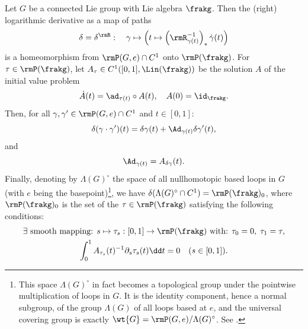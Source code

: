 \begin{lem}[{{\cite[Prop.~1.13.4]{DK}}}]\label{lem invertibility of D}
    Let $G$ be a connected Lie group with Lie algebra $\frakg$. Then the (right) logarithmic derivative as a map of paths
    \[\delta=\delta^\rmR:\quad \gamma\mapsto \left(t\mapsto \left(\rmR_{\gamma(t)}^{-1}\right)_\ast\dot\gamma(t)\right)\]
    is a homeomorphism from $\rmP(G,e)\cap C^1$ onto $\rmP(\frakg)$. For $\tau\in \rmP(\frakg)$, let $A_\tau\in C^1([0,1],\Lin(\frakg))$
    be the solution $A$ of the initial value problem
    \[\dot A(t)=\ad_{\tau(t)}\circ A(t),\quad A(0)=\id_{\frakg}.\label{1792}\]
    Then, for all $\gamma,\gamma'\in \rmP(G,e)\cap C^1$ and $t\in [0,1]$:
    \[\delta(\gamma\cdot \gamma')(t)=\delta\gamma(t)+\Ad_{\gamma(t)}\delta \gamma'(t),\label{1794}\]
    and 
    \[\Ad_{\gamma(t)}=A_{\delta \gamma}(t).\]
    Finally, denoting by $\Lambda(G)^\circ$ the space of all nullhomotopic based loops in $G$ (with $e$ being the basepoint)\footnote{This space $\Lambda(G)^\circ$ in fact becomes a topological group under the pointwise multiplication of loops in $G$. It is the identity component, hence a normal subgroup, of the group $\Lambda(G)$ of all loops based at $e$, and the universal covering group is exactly $\wt{G}=\rmP(G,e)\slash\Lambda(G)^\circ$. See \cite[Prop.~1.13.2]{DK}.}, we have $\delta(\Lambda(G)^\circ\cap C^1)=\rmP(\frakg)_0$,
    where $\rmP(\frakg)_0$ is the set of the $\tau\in\rmP(\frakg)$ satisfying the following conditions:
    \begin{gather}
        \exists \text{ smooth mapping: } s\mapsto \tau_s:[0,1]\to \rmP(\frakg)\text{ with: } \tau_0=0,\;\tau_1=\tau,\\
        \int_0^1 A_{\tau_s}(t)^{-1}\partial_s\tau_s(t)\dd t=0\quad (s\in [0,1]).
    \end{gather}
\end{lem}

